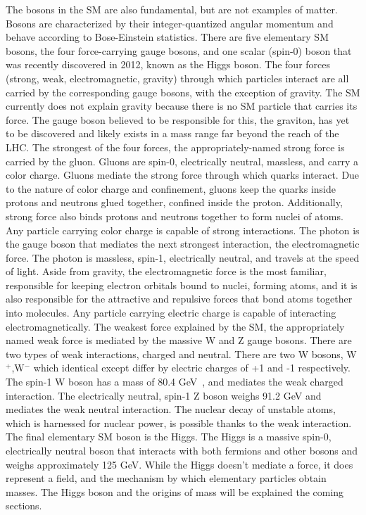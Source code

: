 The bosons in the SM are also fundamental, but are not examples of matter. Bosons are characterized by their integer-quantized angular momentum and behave according to Bose-Einstein statistics. There are five elementary SM bosons, the four force-carrying gauge
bosons, and one scalar (spin-0) boson that was recently discovered in 2012, known as the Higgs boson. The four forces (strong, weak, electromagnetic, gravity) through which particles interact are all carried by the corresponding gauge bosons, with the exception
of gravity. The SM currently does not explain gravity because there is no SM particle that carries its force. The gauge boson believed to be responsible for this, the graviton, has yet to be discovered and likely exists in a mass range far beyond the reach of
the LHC. The strongest of the four forces, the appropriately-named strong force is carried by the gluon. Gluons are spin-0, electrically neutral, massless, and carry a color charge. Gluons mediate the strong force through which quarks interact. Due to the nature of
color charge and confinement, gluons keep the quarks inside protons and neutrons glued together, confined inside the proton. Additionally, strong force also binds protons and neutrons together to form nuclei of atoms. Any particle carrying color charge is capable
of strong interactions. 
The photon is the gauge boson that mediates the next strongest interaction, the electromagnetic force. The photon is massless, spin-1, electrically neutral, and travels at the speed of light. Aside from gravity, the electromagnetic force is the most familiar,
responsible for keeping electron orbitals bound to nuclei, forming atoms, and it is also responsible for the attractive and repulsive forces that bond atoms together into molecules. Any particle carrying electric charge is capable of interacting electromagnetically.
The weakest force explained by the SM, the appropriately named weak force is mediated by the massive W and Z gauge bosons. There are two types of weak interactions, charged and neutral.
There are two W bosons, W$^+$,W$^-$ which identical except differ by electric charges of +1 and -1 respectively. The spin-1 W boson has a mass of 80.4 GeV~\cite{LopesdeSa:2012ak}, and mediates the weak charged interaction.
The electrically neutral, spin-1 Z boson weighs 91.2 GeV and mediates the weak neutral interaction. The nuclear decay of unstable atoms, which is harnessed for nuclear power, is possible thanks to the weak interaction.
The final elementary SM boson is the Higgs. The Higgs is a massive spin-0, electrically neutral boson that interacts with both fermions and other bosons and weighs approximately 125 GeV. While the Higgs doesn't mediate a force, it does represent a field, and the
mechanism by which elementary particles obtain masses. The Higgs boson and the origins of mass will be explained the coming sections. 

